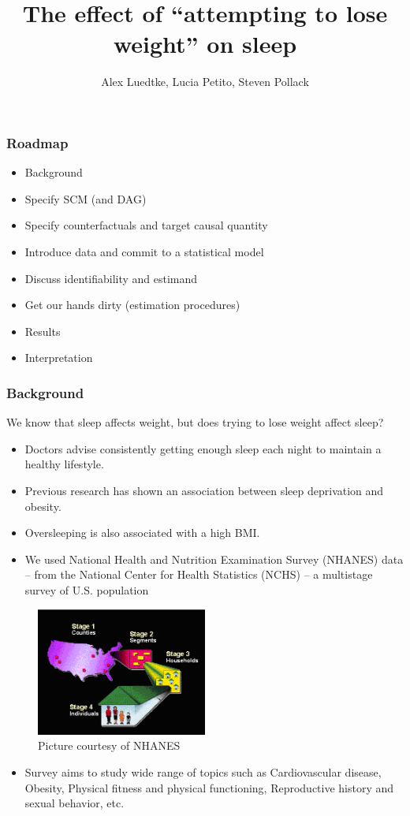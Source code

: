 \documentclass{beamer}
\title[Project Presentation]{ The effect of ``attempting to lose weight'' on sleep }
\author{Alex Luedtke, Lucia Petito, Steven Pollack}
\institute{PHC252D}
\date{}
\begin{document}
\maketitle 
\begin{frame}
 \frametitle{Roadmap} 
  \begin{itemize}
    \item Background
    \item Specify SCM (and DAG)
    \item Specify counterfactuals and target causal quantity
    \item Introduce data and commit to a statistical model
    \item Discuss identifiability and estimand
    \item Get our hands dirty (estimation procedures)
    \item Results
    \item Interpretation
  \end{itemize}
\end{frame}

\begin{frame}
 \frametitle{Background}
 We know that sleep affects weight, but does trying to lose weight affect sleep?
  \begin{itemize}
    \item Doctors advise consistently getting enough sleep each night to maintain a healthy lifestyle.  
    \item Previous research has shown an association between sleep deprivation and obesity.
    \item Oversleeping is also associated with a high BMI.
  \end{itemize}
\end{frame}

\begin{frame}
 \begin{itemize}
  \item We used National Health and Nutrition Examination Survey (NHANES) data -- from the National Center for Health Statistics (NCHS) -- a multistage survey of U.S. population
 \end{itemize}
 \begin{figure}
 \centering
  \includegraphics[width=0.5\textwidth]{Survey_Design.PNG}
  \caption{Picture courtesy of NHANES}
 \end{figure}
 \begin{itemize}
  \item Survey aims to study wide range of topics such as Cardiovascular disease, Obesity, Physical fitness and physical functioning, Reproductive history and sexual behavior, etc.
 \end{itemize}
\end{frame}
\end{document}
